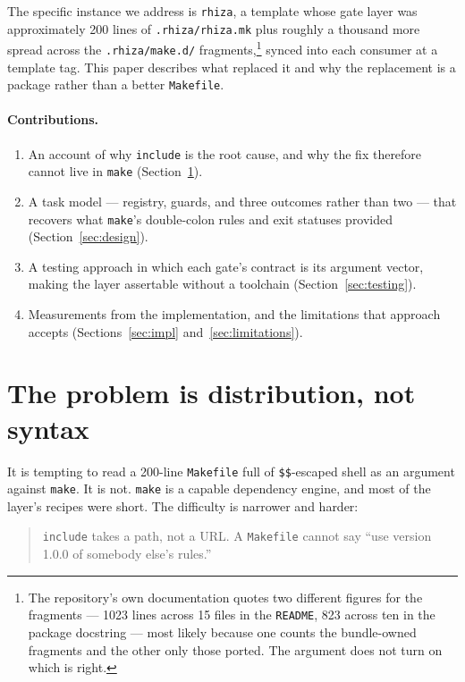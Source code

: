 \documentclass[11pt,a4paper]{article}
\begin{document}
The specific instance we address is \texttt{rhiza}, a template whose gate layer was
approximately 200 lines of \texttt{.rhiza/rhiza.mk} plus roughly a thousand more spread
across the \texttt{.rhiza/make.d/} fragments,\footnote{The repository's own documentation
quotes two different figures for the fragments --- 1023 lines across 15 files in the
\texttt{README}, 823 across ten in the package docstring --- most likely because one counts
the bundle-owned fragments and the other only those ported. The argument does not turn on
which is right.} synced into each consumer at a template tag. This paper describes what
replaced it and why the replacement is a package rather than a better \texttt{Makefile}.

\paragraph{Contributions.}
\begin{enumerate}\itemsep2pt
  \item An account of why \texttt{include} is the root cause, and why the fix therefore
        cannot live in \texttt{make} (Section~\ref{sec:problem}).
  \item A task model --- registry, guards, and three outcomes rather than two --- that
        recovers what \texttt{make}'s double-colon rules and exit statuses provided
        (Section~\ref{sec:design}).
  \item A testing approach in which each gate's contract is its argument vector, making
        the layer assertable without a toolchain (Section~\ref{sec:testing}).
  \item Measurements from the implementation, and the limitations that approach accepts
        (Sections~\ref{sec:impl} and~\ref{sec:limitations}).
\end{enumerate}

\section{The problem is distribution, not syntax}
\label{sec:problem}

It is tempting to read a 200-line \texttt{Makefile} full of \texttt{\$\$}-escaped shell as
an argument against \texttt{make}. It is not. \texttt{make} is a capable dependency engine,
and most of the layer's recipes were short. The difficulty is narrower and harder:

\begin{quote}
\texttt{include} takes a path, not a URL. A \texttt{Makefile} cannot say ``use version
1.0.0 of somebody else's rules.''
\end{quote}
\end{document}
